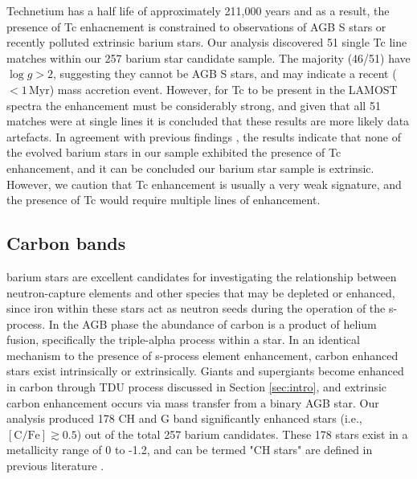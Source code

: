 \documentclass[a4paper,fleqn,usenatbib]{mnras}
\begin{document}
Technetium has a half life of approximately 211,000 years and as a result, the presence of Tc enhacnement is constrained to observations of AGB S stars \citep{jorissen1993} or recently polluted extrinsic barium stars. Our analysis discovered 51 single Tc line matches within our 257 barium star candidate sample. The majority (46/51) have $\log{g} > 2$, suggesting they cannot be AGB S stars, and may indicate a recent ($<1\,\textrm{Myr}$) mass accretion event. However, for Tc to be present in the LAMOST spectra the enhancement must be considerably strong, and given that all 51 matches were at single lines it is concluded that these results are more likely data artefacts. In agreement with previous findings \citep[e.g.,][]{little1987,smith1984,smith1983}, the results indicate that none of the evolved barium stars in our sample exhibited the presence of Tc enhancement, and it can be concluded our barium star sample is extrinsic. However, we caution that Tc enhancement is usually a very weak signature, and the presence of Tc would require multiple lines of enhancement.

\subsection{Carbon bands}
barium stars are excellent candidates for investigating the relationship between neutron-capture elements and other species that may be depleted or enhanced, since iron within these stars act as neutron seeds during the operation of the s-process. In the AGB phase the abundance of carbon is a product of helium fusion, specifically the triple-alpha process within a star. In an identical mechanism to the presence of s-process element enhancement, carbon enhanced stars exist intrinsically or extrinsically. Giants and supergiants become enhanced in carbon through TDU process discussed in Section \ref{sec:intro}, and extrinsic carbon enhancement occurs via mass transfer from a binary AGB star. Our analysis produced 178 CH and G band significantly enhanced stars (i.e., $[\textrm{C/Fe}] \gtrsim 0.5$) out of the total 257 barium candidates. These 178 stars exist in a metallicity range of 0 to -1.2, and can be termed "CH stars" are defined in previous literature \citep[e.g.][]{luck1991, mcclure1997}.
\end{document}
